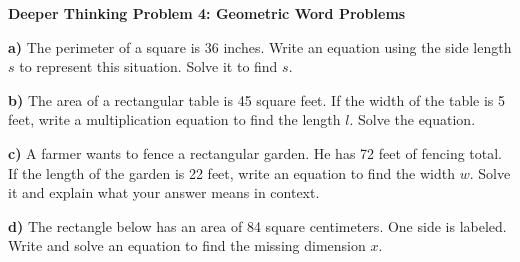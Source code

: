 \documentclass[12pt, letterpaper, fleqn]{article}
\begin{document}
\begin{tcolorbox}[colback=white, colframe=black, boxrule=1pt, arc=4mm, left=6mm, right=6mm, top=5mm, bottom=5mm]
\textbf{Deeper Thinking Problem 4: Geometric Word Problems}

\medskip

\noindent
\textbf{a)} The perimeter of a square is 36 inches. Write an equation using the side length $s$ to represent this situation. Solve it to find $s$.

\vspace{2.5cm}

\noindent
\textbf{b)} The area of a rectangular table is 45 square feet. If the width of the table is 5 feet, write a multiplication equation to find the length $l$. Solve the equation.

\vspace{2.5cm}

\noindent
\textbf{c)} A farmer wants to fence a rectangular garden. He has 72 feet of fencing total. If the length of the garden is 22 feet, write an equation to find the width $w$. Solve it and explain what your answer means in context.

\vspace{2.5cm}

\noindent
\textbf{d)} The rectangle below has an area of 84 square centimeters. One side is labeled. Write and solve an equation to find the missing dimension $x$.

\begin{center}
\end{center}

\vspace{3cm}
\end{tcolorbox}
\end{document}
